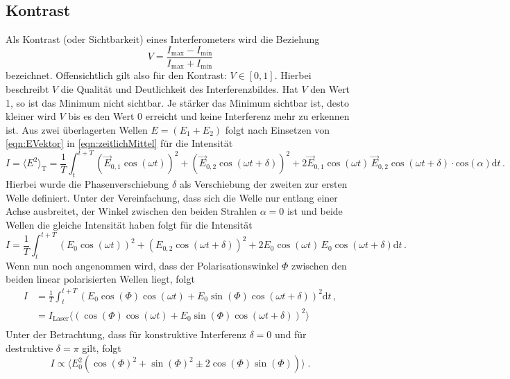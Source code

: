 \subsection{Kontrast} \label{sec:kontrast}
Als Kontrast (oder Sichtbarkeit) eines Interferometers wird die Beziehung
\begin{equation} \label{eqn:kontrast}
    V = \frac{I_\text{max} - I_\text{min}}{I_\text{max} + I_\text{min}}
\end{equation}
bezeichnet. Offensichtlich gilt also für den Kontrast: $V \in [0,1]$.
Hierbei beschreibt $V$ die Qualität und Deutlichkeit des Interferenzbildes. Hat $V$ den Wert 1, so ist das Minimum nicht sichtbar. Je stärker das Minimum sichtbar ist, desto kleiner wird $V$ bis es den Wert 0 erreicht und keine Interferenz mehr zu erkennen ist.
Aus zwei überlagerten Wellen $E=(E_1+E_2)$ folgt nach Einsetzen von \autoref{eqn:EVektor} in \autoref{eqn:zeitlichMittel} für die Intensität
\begin{equation*}
    I = \langle E^2\rangle _{\text{T}}= \frac{1}{T}\int_t^{t+T}  (\vec{E}_{0,1}\cos{(\omega t)})^2+(\vec{E}_{0,2}\cos{(\omega t+ \delta)})^2+2\vec{E}_{0,1}\cos{(\omega t)}\, \vec{E}_{0,2}\cos{(\omega t+ \delta)}\cdot\text{cos}(\alpha)\text{d}t\, .
\end{equation*}
Hierbei wurde die Phasenverschiebung $\delta$ als Verschiebung der zweiten zur ersten Welle definiert. Unter der Vereinfachung, dass sich die Welle nur entlang einer Achse ausbreitet, der Winkel zwischen den beiden Strahlen $\alpha=0$ ist und beide Wellen die gleiche Intensität haben folgt für die Intensität 
\begin{equation*}
    I=\frac{1}{T}\int_t^{t+T} (E_{0}\cos{(\omega t)})^2+(E_{0,2}\cos{(\omega t+ \delta)})^2+2E_{0}\cos{(\omega t)}\, E_{0}\cos{(\omega t+ \delta)}\text{d}t\, .
\end{equation*}
Wenn nun noch angenommen wird, dass der Polarisationswinkel $\Phi$ zwischen den beiden linear polarisierten Wellen liegt, folgt
\begin{align*}
    I&=\frac{1}{T}\int_t^{t+T} (E_{0}\cos{(\Phi)}\cos{(\omega t)}+E_{0}\sin{(\Phi)}\cos{(\omega t+ \delta)})^2\text{d}t\, ,\\
    &= I_{\text{Laser}}\langle (\cos{(\Phi)}\cos{(\omega t)}+E_{0}\sin{(\Phi)}\cos{(\omega t+ \delta)})^2\rangle \\
\end{align*}
Unter der Betrachtung, dass für konstruktive Interferenz $\delta = 0$ und für destruktive $\delta =\pi$ gilt, folgt
\begin{equation*}
    I\propto  \langle E_{0}^2 (\cos{(\Phi)}^2+\sin{(\Phi)}^2\pm 2\cos{(\Phi)}\sin{(\Phi)})\rangle \; .
\end{equation*}
